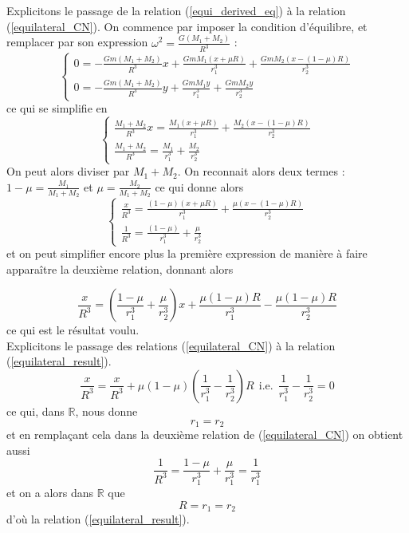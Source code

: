 \documentclass[12pt]{article}
\theoremstyle{definition}
\theoremstyle{definition}
\begin{document}
	Explicitons le passage de la relation (\ref{equi_derived_eq}) à la relation (\ref{equilateral_CN}). On commence par imposer la condition d'équilibre, et remplacer par son expression $\omega^2 = \frac{G(M_1+M_2)}{R^3}$ :
	\begin{equation*}
		\begin{cases}
			0 = -\frac{Gm(M_1+M_2)}{R^3}x+\frac{GmM_1(x+\mu R)}{r_1^3}+\frac{GmM_2(x-(1-\mu)R)}{r_2^3}
			\\
			0 = -\frac{Gm(M_1+M_2)}{R^3}y+\frac{GmM_1y}{r_1^3}+\frac{GmM_2y}{r_2^3}
		\end{cases}
	\end{equation*}
	ce qui se simplifie en
	\begin{equation*}
		\begin{cases}
			\frac{M_1+M_2}{R^3}x = \frac{M_1(x+\mu R)}{r_1^3}+\frac{M_2(x-(1-\mu)R)}{r_2^3}
			\\
			\frac{M_1+M_2}{R^3} = \frac{M_1}{r_1^3}+\frac{M_2}{r_2^3}
		\end{cases}
	\end{equation*}
	On peut alors diviser par $M_1+M_2$. On reconnait alors deux termes : $1-\mu = \frac{M_1}{M_1+M_2}$ et $\mu = \frac{M_2}{M_1+M_2}$ ce qui donne alors
	\begin{equation*}
		\begin{cases}
			\frac{x}{R^3} = \frac{(1-\mu)(x+\mu R)}{r_1^3}+\frac{\mu(x-(1-\mu)R)}{r_2^3}
			\\
			\frac{1}{R^3} = \frac{(1-\mu)}{r_1^3}+\frac{\mu}{r_2^3}
		\end{cases}
	\end{equation*}
	et on peut simplifier encore plus la première expression de manière à faire apparaître la deuxième relation, donnant alors
	
	\begin{equation*}
		\frac{x}{R^3} = (\frac{1-\mu}{r_1^3} + \frac{\mu}{r_2^3})x + \frac{\mu(1-\mu)R}{r_1^3} - \frac{\mu(1-\mu)R}{r_2^3}
	\end{equation*}
	ce qui est le résultat voulu.
	\\
	
	Explicitons le passage des relations (\ref{equilateral_CN}) à la relation (\ref{equilateral_result}).
	\begin{equation*}
		\frac{x}{R^3} = \frac{x}{R^3} + \mu(1-\mu)(\frac{1}{r_1^3}-\frac{1}{r_2^3})R \ \ \text{i.e.} \ \ \frac{1}{r_1^3}-\frac{1}{r_2^3} = 0
	\end{equation*}
	ce qui, dans $\mathbb{R}$, nous donne
	\begin{equation*}
		r_1=r_2
	\end{equation*}
	et en remplaçant cela dans la deuxième relation de (\ref{equilateral_CN}) on obtient aussi
	\begin{equation*}
		\frac{1}{R^3} = \frac{1-\mu}{r_1^3} + \frac{\mu}{r_1^3} = \frac{1}{r_1^3}
	\end{equation*}
	et on a alors dans $\mathbb{R}$ que
	\begin{equation*}
		R=r_1=r_2
	\end{equation*}
	d'où la relation (\ref{equilateral_result}).
	
	
\end{document}
